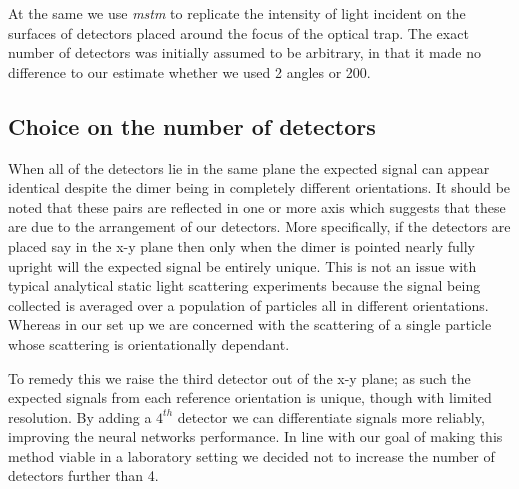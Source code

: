 At the same we use \textit{mstm} to replicate the intensity of light
incident on the surfaces of detectors placed around the focus of the
optical trap. The exact number of detectors was initially assumed to 
be arbitrary, in that it made no difference to our estimate whether 
we used 2 angles or 200.

\subsection{Choice on the number of detectors}
When all of the detectors lie in the same plane the expected signal 
can appear identical despite the dimer being in completely different orientations. It should be noted that these pairs are reflected in 
one or more axis which suggests that these are due to the arrangement 
of our detectors. More specifically, if the detectors are placed say 
in the x-y plane then only when the dimer is pointed nearly fully 
upright will the expected signal be entirely unique. This is not an 
issue with typical analytical static light scattering experiments 
because the signal being collected is averaged over a population of 
particles all in different orientations. Whereas in our set up we are concerned with the scattering of a single particle whose scattering is orientationally dependant. 

To remedy this we raise the third detector out of the x-y plane; 
as such the expected signals from each reference orientation is 
unique, though with limited resolution. By adding a $4^{th}$ 
detector we can differentiate signals more reliably, improving the 
neural networks performance. In line with our goal of making this 
method viable in a laboratory setting we decided not to increase 
the number of detectors further than 4. 

